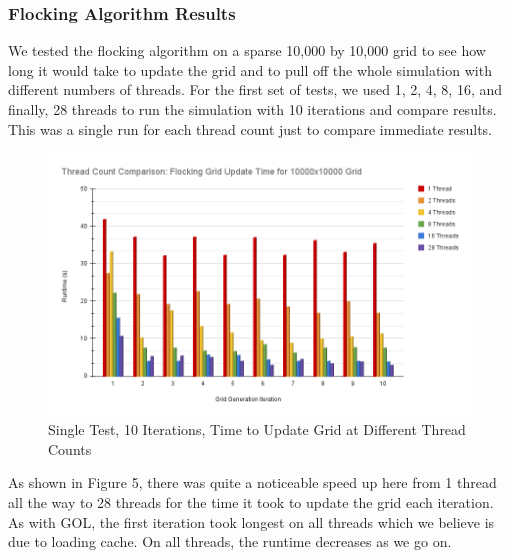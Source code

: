 \documentclass[12pt]{article}
\begin{document}
\subsubsection{Flocking Algorithm Results}
\par We tested the flocking algorithm on a sparse 10,000 by 10,000 grid to see how long it would take to update the grid and to pull off the whole simulation with different numbers of threads. For the first set of tests, we used 1, 2, 4, 8, 16, and finally, 28 threads to run the simulation with 10 iterations and compare results. This was a single run for each thread count just to compare immediate results.
\begin{figure}[htbp]
\centering
\includegraphics[width=\linewidth]{FlockingGridUpdate1.png}
\caption{\label{fig:flock_1}Single Test, 10 Iterations, Time to Update Grid at Different Thread Counts}
\end{figure}
\par As shown in Figure 5, there was quite a noticeable speed up here from 1 thread all the way to 28 threads for the time it took to update the grid each iteration. As with GOL, the first iteration took longest on all threads which we believe is due to loading cache. On all threads, the runtime decreases as we go on.
\end{document}
